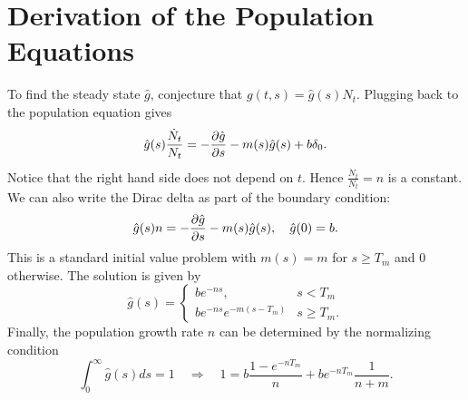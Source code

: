 \documentclass[a4paper, 12pt]{article}
\begin{document}
\section{Derivation of the Population Equations}\label{app:pop_eqs}
To find the steady state $\hat{g}$, conjecture that $g(t, s) = \hat{g}(s)N_t$. 
Plugging back to the population equation gives 
\begin{equation}
    \hat{g}(s)\frac{\dot{N}_t}{N_t} = -\frac{\partial{\hat{g}}}{\partial{s}} - m(s)\hat{g}(s) + b\delta_0. 
\end{equation}
Notice that the right hand side does not depend on $t$. Hence $\frac{\dot{N}_t}{N_t} = n$ 
is a constant. We can also write the Dirac delta as part of the boundary condition: 
\begin{equation}
    \hat{g}(s)n = -\frac{\partial{\hat{g}}}{\partial{s}} - m(s)\hat{g}(s), \quad 
    \hat{g}(0) = b. 
\end{equation}
This is a standard initial value problem with $m(s) = m$ for $s \geq T_m$ and $0$ 
otherwise. The solution is given by 
\begin{equation}
    \hat{g}(s) = \begin{cases}
        be^{-ns}, & s < T_m \\ 
        be^{-ns}e^{-m(s-T_m)} & s\geq T_m. 
    \end{cases}
\end{equation}
Finally, the population growth rate $n$ can be determined by the normalizing condition  
\begin{equation}
    \int_0^\infty \hat{g}(s)ds = 1\quad \Rightarrow\quad 1 = b\frac{1 - e^{-nT_m}}{n} + be^{-nT_m}\frac{1}{n+m}.
\end{equation}




\end{document}
